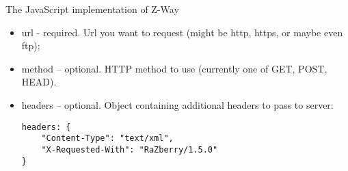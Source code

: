 The JavaScript implementation of Z-Way 
\begin{itemize}
\item url - required. Url you want to request (might be http, https, or maybe even ftp);
\item method – optional. HTTP method to use (currently one of GET, POST, HEAD). 
\item headers – optional. Object containing additional headers to pass to server:

\begin{lstlisting}
headers: {
    "Content-Type": "text/xml",
    "X-Requested-With": "RaZberry/1.5.0"
}
\end{lstlisting}


\end{itemize}
